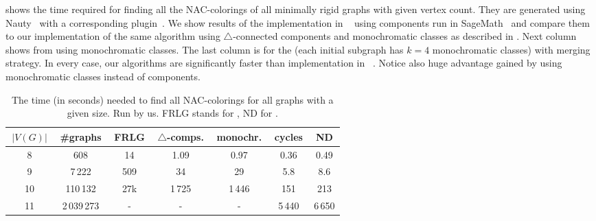 shows the time required for finding all the NAC-colorings
of all minimally rigid graphs with given vertex count.
%
They are generated using Nauty~\cite{nauty}
with a corresponding plugin~\cite{nauty_plugin}.
%
We show results of the implementation
in \flexrilog{}~\cite{flexrilog} using \trcon{} components
run in SageMath~\cite{sagemath}
and compare them to our implementation of the same \Naive{} algorithm
using $\triangle$-connected components
and monochromatic classes as described in .
Next column shows \NaiveCycles{} from 
using monochromatic classes.
The last column is for the \NeighborsDegree{} (each initial subgraph has $k=4$ monochromatic classes)
with \MergeLinear{} merging strategy.
%
In every case, our algorithms are significantly faster than implementation in \flexrilog{}~\cite{flexrilog}.
Notice also huge advantage gained by using monochromatic classes instead of \trcon{} components.
%
\begin{table}[ht]
	\caption[Running times on graphs]{
		The time (in seconds) needed to find all NAC-colorings for all graphs with a given size. Run by us.
		\textsc{FRLG} stands for \flexrilog{}, \textsc{ND} for \NeighborsDegree{}.}%
	\label{tab:all_min_rigid}
	\vspace{0.3cm}
	\centering
	\begin{tabular}{ccccccc}
		\hline
		\,$|V(G)|$\, & \,\#graphs\, & \,FRLG\, & \,$\triangle$-comps.\, & \,monochr.\, & \,cycles\, & \,\textsc{ND}\, \\
		\hline
		8            & 608          & 14       & 1.09                   & 0.97         & 0.36       & 0.49            \\
		9            & 7\,222       & 509      & 34                     & 29           & 5.8        & 8.6             \\
		10           & 110\,132     & 27k      & 1\,725                 & 1\,446       & 151        & 213             \\
		11           & 2\,039\,273  & -        & -                      & -            & 5\,440     & 6\,650          \\
		\hline
	\end{tabular}
\end{table}


